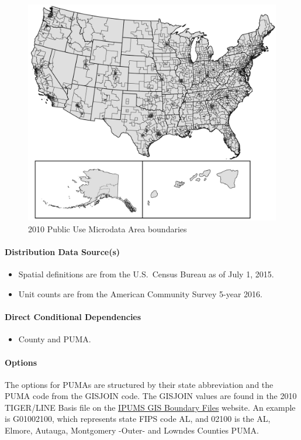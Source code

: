 \begin{figure}
    \centering
    \includegraphics[width=1\linewidth]{images/2010-PUMAs.png}
    \caption{2010 Public Use Microdata Area boundaries}
    \label{fig:2010_puma_boundaries}
\end{figure}

\paragraph{Distribution Data Source(s)}
\begin{itemize} 
\item
  Spatial definitions are from the U.S.~Census Bureau as of July 1,
  2015.
\item
  Unit counts are from the American Community Survey 5-year 2016.
\end{itemize}
\paragraph{Direct Conditional Dependencies}
\begin{itemize}
    \item County and PUMA.
\end{itemize}
\paragraph{Options}
The options for PUMAs are structured by their state abbreviation and the PUMA code from the GISJOIN code. The GISJOIN values are found in the 2010 TIGER/LINE Basis file on the \href{https://usa.ipums.org/usa/volii/boundaries.shtml}{IPUMS GIS Boundary Files}  website. An example is G01002100, which represents state FIPS code AL, and 02100 is the AL, Elmore, Autauga, Montgomery -Outer- and Lowndes Counties PUMA.

